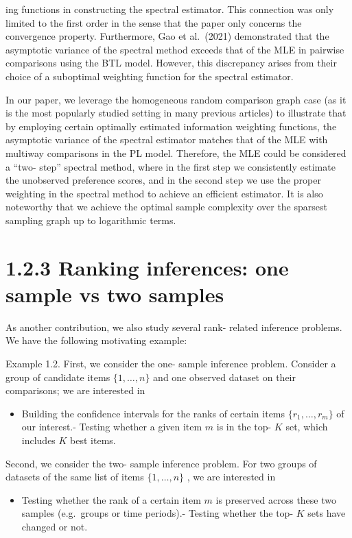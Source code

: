 ing functions in constructing the spectral estimator. This connection
was only limited to the first order in the sense that the paper only
concerns the convergence property. Furthermore, Gao et al.~(2021)
demonstrated that the asymptotic variance of the spectral method exceeds
that of the MLE in pairwise comparisons using the BTL model. However,
this discrepancy arises from their choice of a suboptimal weighting
function for the spectral estimator.

In our paper, we leverage the homogeneous random comparison graph case
(as it is the most popularly studied setting in many previous articles)
to illustrate that by employing certain optimally estimated information
weighting functions, the asymptotic variance of the spectral estimator
matches that of the MLE with multiway comparisons in the PL model.
Therefore, the MLE could be considered a ``two- step'' spectral method,
where in the first step we consistently estimate the unobserved
preference scores, and in the second step we use the proper weighting in
the spectral method to achieve an efficient estimator. It is also
noteworthy that we achieve the optimal sample complexity over the
sparsest sampling graph up to logarithmic terms.

\section{1.2.3 Ranking inferences: one sample vs two
samples}\label{ranking-inferences-one-sample-vs-two-samples}

As another contribution, we also study several rank- related inference
problems. We have the following motivating example:

Example 1.2. First, we consider the one- sample inference problem.
Consider a group of candidate items \(\{1,\dots ,n\}\) and one observed
dataset on their comparisons; we are interested in

\begin{itemize}
\tightlist
\item
  Building the confidence intervals for the ranks of certain items
  \(\{r_1,\dots ,r_m\}\) of our interest.- Testing whether a given item
  \(m\) is in the top- \(K\) set, which includes \(K\) best items.
\end{itemize}

Second, we consider the two- sample inference problem. For two groups of
datasets of the same list of items \(\{1,\dots ,n\}\) , we are
interested in

\begin{itemize}
\tightlist
\item
  Testing whether the rank of a certain item \(m\) is preserved across
  these two samples (e.g.~groups or time periods).- Testing whether the
  top- \(K\) sets have changed or not.
\end{itemize}

